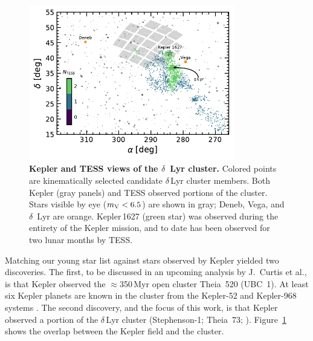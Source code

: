 \documentclass[12pt,modern,twocolumn,tighten]{aastex63}
\begin{document}
\begin{figure}[t]
	\begin{center}
		\leavevmode
		\includegraphics[width=0.8\textwidth]{f2.pdf}
	\end{center}
	\vspace{-0.7cm}
	\caption{
		{\bf Kepler and TESS views of the $\delta$~Lyr cluster.} Colored
		points are kinematically selected candidate $\delta$\,Lyr cluster
		members.  Both Kepler (gray panels) and TESS observed portions of
		the cluster.  Stars visible by eye ($m_{\rm V}<6.5$) are shown in gray;
		Deneb, Vega, and $\delta$~Lyr are orange.  Kepler\,1627 (green star) was observed during the
		entirety of the Kepler mission, and to date has been observed for
		two lunar months by TESS.%
		\label{fig:skychart}
	}
\end{figure}

Matching our young star list against stars observed by Kepler yielded
two discoveries.  The first, to be discussed in an upcoming analysis
by J.~Curtis et al{.}, is that Kepler observed the $\approx$350\,Myr
open cluster Theia~520 (UBC~1).  At least six Kepler planets are known
in the cluster from the Kepler-52 and Kepler-968 systems
\citep{rowe_validation_2014,jontof-hutter_following_2021}.  The second
discovery, and the focus of this work, is that Kepler observed a
portion of the $\delta$\,Lyr cluster (Stephenson-1; Theia~73;
\citealt{stephenson_possible_1959}).  Figure~\ref{fig:skychart} shows
the overlap between the Kepler field and the cluster.
\end{document}

